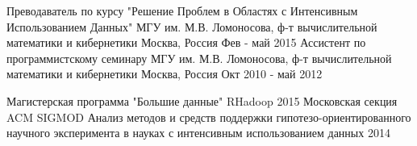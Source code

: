\begin{cventries}
\cventry
    {Преводаватель по курсу "Решение Проблем в Областях с Интенсивным Использованием Данных"}
    {МГУ им. М.В. Ломоносова, ф-т вычислительной математики и кибернетики}
    {Москва, Россия}
    {Фев - май 2015}
    {}
\cventry
    {Ассистент по программистскому семинару}
    {МГУ им. М.В. Ломоносова, ф-т вычислительной математики и кибернетики}
    {Москва, Россия}
    {Окт 2010 - май 2012}
    {}
\end{cventries}

\begin{cvhonors}
  \cvhonor
    {Магистерская программа "Большие данные"}
    {RHadoop}
    {}
    {2015}
    \cvhonor
    {Московская секция ACM SIGMOD}
    {Анализ методов и средств поддержки гипотезо-ориентированного научного эксперимента в науках с интенсивным использованием данных}
    {}
    {2014}
\end{cvhonors}
